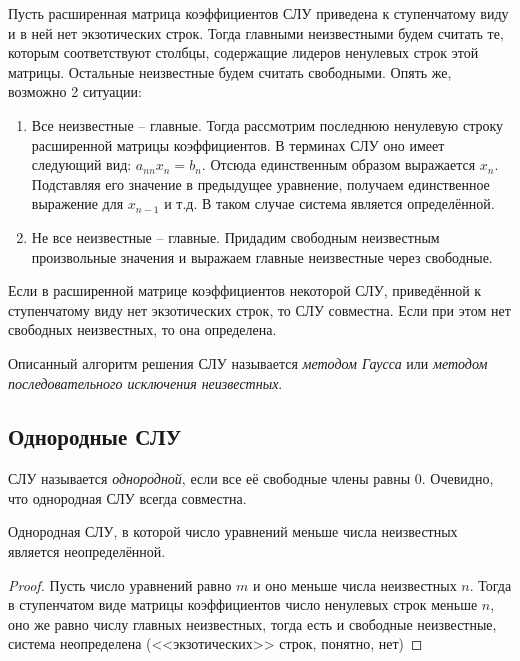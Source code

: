   Пусть расширенная матрица коэффициентов СЛУ приведена к ступенчатому виду и в ней нет экзотических строк. Тогда главными неизвестными будем считать те, которым соответствуют столбцы, содержащие лидеров ненулевых строк этой матрицы. Остальные неизвестные будем считать свободными. Опять же, возможно 2 ситуации:
  \begin{enumerate}
    \item Все неизвестные -- главные. Тогда рассмотрим последнюю ненулевую строку расширенной матрицы коэффициентов. В терминах СЛУ оно имеет следующий вид: $a_{nn}x_n = b_n$. Отсюда единственным образом выражается $x_n$. Подставляя его значение в предыдущее уравнение, получаем единственное выражение для $x_{n-1}$ и т.д. В таком случае система является определённой.
    \item Не все неизвестные -- главные. Придадим свободным неизвестным произвольные значения и выражаем главные неизвестные через свободные.
  \end{enumerate}

  \begin{stm}
    Если в расширенной матрице коэффициентов некоторой СЛУ, приведённой к ступенчатому виду нет экзотических строк, то СЛУ совместна. Если  при этом нет свободных неизвестных, то она определена.
  \end{stm}

  Описанный алгоритм решения СЛУ называется \emph{методом Гаусса} или \emph{методом последовательного исключения неизвестных}.

  \subsection{Однородные СЛУ}
  \label{oslu}

  \begin{df}
    СЛУ называется \emph{однородной}, если все её свободные члены равны 0. Очевидно, что однородная СЛУ всегда совместна.
  \end{df}

  \begin{theorem}
    Однородная СЛУ, в которой число уравнений меньше числа неизвестных является неопределённой.
  \end{theorem}
  \begin{proof}
    Пусть число уравнений равно $m$ и оно меньше числа неизвестных $n$. Тогда в ступенчатом виде матрицы коэффициентов число ненулевых строк меньше $n$, оно же равно числу главных неизвестных, тогда есть и свободные неизвестные, система неопределена (<<экзотических>> строк, понятно, нет)
  \end{proof}

